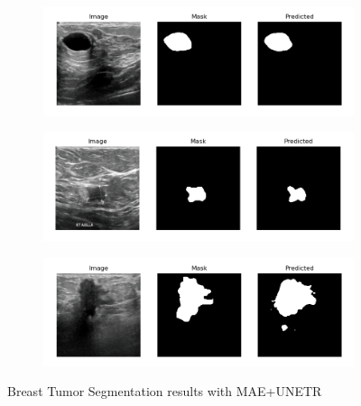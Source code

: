 \begin{figure}[]
    \centering
    \begin{subfigure}{1\textwidth}
        \centering
        \includegraphics[width=\linewidth]{images/results/BUSI-maep.png}
        \subcaption{}
        \label{fig:busi-mae1}
    \end{subfigure}
    \vspace{1em}   
    \begin{subfigure}{1\textwidth}
        \centering
        \includegraphics[width=\linewidth]{images/results/BUSI-mae7.png}
        \subcaption{}
        \label{fig:busi-mae2}
    \end{subfigure}
    \vspace{1em}
    \begin{subfigure}{1\textwidth}
        \centering
        \includegraphics[width=\linewidth]{images/results/BUSI-mae11.png}
        \subcaption{}
        \label{fig:busi-mae3}
    \end{subfigure}
    \caption{Breast Tumor Segmentation results with MAE+UNETR}
    \label{fig:busi-mae}
\end{figure}

